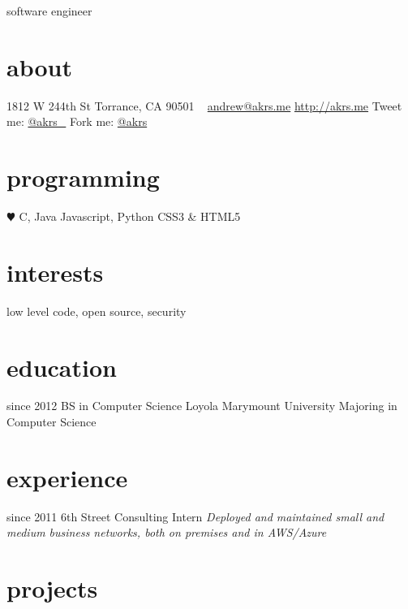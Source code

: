 \documentclass[]{akers-cv}
\begin{document}
       {software engineer}


\begin{aside}
  \section{about}
    1812 W 244th St
    Torrance, CA 90501
    ~
    \href{mailto:andrew@akrs.me}{andrew@akrs.me}
    \href{http://akrs.me}{http://akrs.me}
    Tweet me: \href{http://twitter.com/akrs_}{@akrs\_}
    Fork me: \href{http://github.com/akrs}{@akrs}
  \section{programming}
    {\color{red} $\varheartsuit$} C, Java
    Javascript, Python
    CSS3 \& HTML5
\end{aside}

\section{interests}

low level code, open source, security

\section{education}

\begin{entrylist}
  \entry
    {since 2012}
    {BS in Computer Science}
    {Loyola Marymount University}
    {Majoring in Computer Science}
\end{entrylist}

\section{experience}

\begin{entrylist}
  \entry
    {since 2011}
    {6th Street Consulting}
    {Intern}
    {\emph{Deployed and maintained small and medium business networks, both on premises and in AWS/Azure}}
\end{entrylist}

\section{projects}
\end{document}
